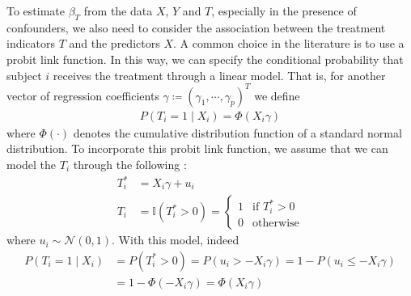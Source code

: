 \documentclass{amsart}
\begin{document}
To estimate $\beta_T$ from the data $X$, $Y$ and $T$,
especially in the presence of confounders,
we also need to consider the
association between the treatment indicators $T$ and the predictors $X$.
A common choice in the literature is to use a probit link function.
In this way, we can
specify the conditional probability that subject $i$ receives the treatment through a linear model. 
That is, for another vector of regression coefficients 
$\gamma\coloneqq(\gamma_1, \cdots, \gamma_p)^T$ we define
\begin{align}
	P(T_i=1\mid X_i) = \Phi(X_i\gamma)
\end{align}
where $\Phi(\cdot)$ denotes the cumulative distribution function
of a standard normal distribution. To incorporate this probit
link function, we assume that we can model the $T_i$ through the following \cite{albert93}:
\begin{align}
    T_i^* &= X_i\gamma +u_i \\
    T_i   &= \mathbb{I}(T_i^*>0)
    =
    \begin{cases}
    1 & \text{if }T_i^*>0 \\
    0 & \text{otherwise}
    \end{cases}
\end{align}
where $u_i\sim\mathcal{N}(0,1)$.
With this model, indeed
\begin{align}
  P(T_i=1\mid X_i)
  &=P(T_i^*>0)=P(u_i>-X_i\gamma)=1-P(u_i\le -X_i\gamma) \\
  &=1-\Phi(-X_i\gamma)=\Phi(X_i\gamma)
\end{align}
\end{document}
